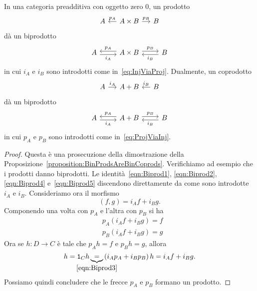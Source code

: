 \begin{proposition}\label{proposition:ProdsAndCoprodsAreBiprods}
  In una categoria preadditiva con oggetto zero \(0\), un prodotto
  \[
    \begin{tikzcd}[column sep=small]
      A & A \times B \ar["{p_A}", l, swap] \ar["{p_B}", r] & B
    \end{tikzcd}
  \]
  dà un biprodotto
  \[
    \begin{tikzcd}
      A \ar["{i_A}", r, shift right, swap] & A \times B \ar["{p_A}", l,
      shift right, swap] \ar["{p_B}", r, shift left] & B \ar["{i_B}", l,
      shift left]
    \end{tikzcd}
  \]
  in cui \(i_A\) e \(i_B\) sono introdotti come
  in~\eqref{eq:InjViaProj}. Dualmente, un coprodotto
  \[
    \begin{tikzcd}[column sep=small]
      A \ar["{i_A}", r] & A + B & B \ar["{i_B}", l, swap]
    \end{tikzcd}
  \]
  dà un biprodotto
  \[
    \begin{tikzcd}
      A \ar["{i_A}", r, shift right, swap] & A+B \ar["{p_A}", l, shift
      right, swap] \ar["{p_B}", r, shift left] & B \ar["{i_B}", l, shift
      left]
    \end{tikzcd}
  \]
  in cui \(p_A\) e \(p_B\) sono introdotti come
  in~\eqref{eq:ProjViaInj}.
\end{proposition}

\begin{proof}
  Questa è una prosecuzione della dimostrazione della
  Proposizione~\ref{proposition:BinProdsAreBinCoprods}. Verifichiamo ad
  esempio che i prodotti danno biprodotti. Le
  identità~\eqref{eqn:Biprod1}, \eqref{eqn:Biprod2}, \eqref{eqn:Biprod4}
  e~\eqref{eqn:Biprod5} discendono direttamente da come sono introdotte
  \(i_A\) e \(i_B\). Consideriamo ora il morfismo
  \[
    (f, g) = i_A f + i_B g .
  \]
  Componendo una volta con \(p_A\) e l'altra con \(p_B\) si ha
  \begin{align*}
    & p_A \left( i_A f + i_B g \right) = f \\
    & p_B \left( i_A f + i_B g \right) = g
  \end{align*}
  Ora se \(h : D \to C\) è tale che \(p_A h = f\) e \(p_B h = g\),
  allora
  \[
    h = \id_C h \underbrace{=}_{\mathclap{\eqref{eqn:Biprod3}}} \left(
      i_A p_A + i_B p_B \right) h = i_A f + i_B g .
  \]
  Possiamo quindi concludere che le frecce \(p_A\) e \(p_B\) formano un
  prodotto.
\end{proof}

